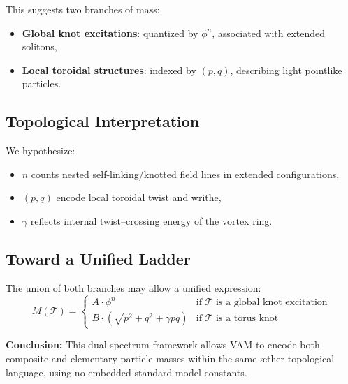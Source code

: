         This suggests two branches of mass:
        \begin{itemize}
          \item \textbf{Global knot excitations}: quantized by $\phi^n$, associated with extended solitons,
          \item \textbf{Local toroidal structures}: indexed by $(p,q)$, describing light pointlike particles.
        \end{itemize}

        \subsection{Topological Interpretation}

        We hypothesize:
        \begin{itemize}
          \item $n$ counts nested self-linking/knotted field lines in extended configurations,
          \item $(p,q)$ encode local toroidal twist and writhe,
          \item $\gamma$ reflects internal twist–crossing energy of the vortex ring.
        \end{itemize}

        \subsection{Toward a Unified Ladder}

        The union of both branches may allow a unified expression:
        \[
        M(\mathcal{T}) =
        \begin{cases}
        A \cdot \phi^n & \text{if } \mathcal{T} \text{ is a global knot excitation} \\
        B \cdot \left( \sqrt{p^2 + q^2} + \gamma pq \right) & \text{if } \mathcal{T} \text{ is a torus knot}
        \end{cases}
        \]

        \textbf{Conclusion:} This dual-spectrum framework allows VAM to encode both composite and elementary particle masses within the same æther-topological language, using no embedded standard model constants.


